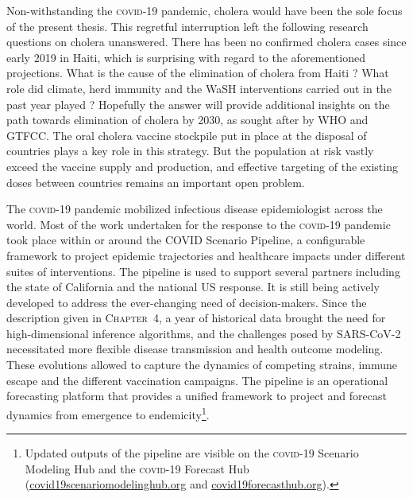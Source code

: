 Non-withstanding the \textsc{covid}-19 pandemic, cholera would have been the sole focus of the present thesis. This regretful interruption left the following research questions on cholera unanswered. There has been no confirmed cholera cases since early 2019 in Haiti, which is surprising with regard to the aforementioned projections. What is the cause of the elimination of cholera from Haiti ? What role did climate, herd immunity and the WaSH interventions carried out in the past year played ? Hopefully the answer will provide additional insights on the path towards elimination of cholera by 2030, as sought after by WHO and GTFCC. The oral cholera vaccine stockpile put in place at the disposal of countries plays a key role in this strategy\cite[-2\baselineskip]{GlobalTaskForceonCholeraControl:EndingCholeraGlobal:2017}. But the population  at risk vastly exceed the vaccine supply and production\cite{Pezzoli:GlobalOralCholera:2019}, and effective targeting of the existing doses between countries remains an important open problem\cite{Lessler:MappingBurdenCholera:2018}.

The \textsc{covid-19} pandemic mobilized infectious disease epidemiologist across the world. Most of the work undertaken for the response to the \textsc{covid}-19 pandemic took place within or around the COVID Scenario Pipeline, a configurable framework to project epidemic trajectories and healthcare impacts under different suites of interventions. The pipeline is used to support several partners including the state of California and the national US response. It is still being actively developed to address the ever-changing need of decision-makers. Since the description given in \textsc{Chapter~4}, a year of historical data brought the need for high-dimensional inference algorithms, and the challenges posed by SARS-CoV-2 necessitated more flexible disease transmission and health outcome modeling. These evolutions allowed to capture the dynamics of competing strains, immune escape and the different vaccination campaigns\cite{Borchering:ModelingFutureCOVID19:2021}. The pipeline is an operational forecasting platform that provides a unified framework to project and forecast dynamics from emergence to endemicity\footnote{Updated outputs of the pipeline are visible on the \textsc{covid}-19 Scenario Modeling Hub and the \textsc{covid}-19 Forecast Hub (\url{covid19scenariomodelinghub.org} and \url{covid19forecasthub.org}).}.

